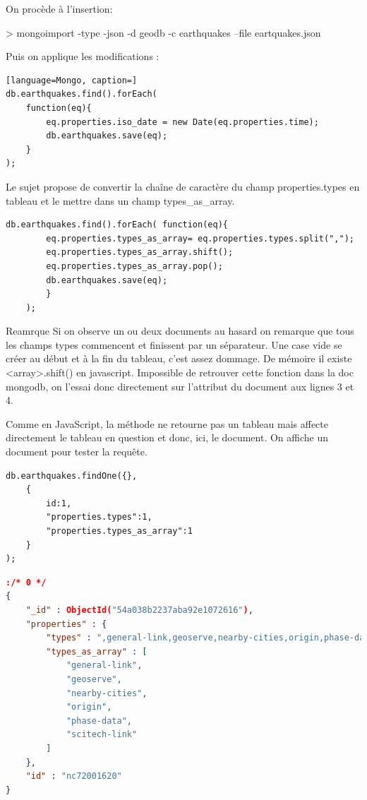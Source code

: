 On procède à l'insertion: \newline
    \begin{tt} > mongoimport -type -json -d geodb -c earthquakes --file
eartquakes.json \end{tt} \newline
    Puis on applique les modifications :
\begin{lstlisting}[language=Mongo, caption=]
db.earthquakes.find().forEach(
    function(eq){
        eq.properties.iso_date = new Date(eq.properties.time);
        db.earthquakes.save(eq);
    }
);
\end{lstlisting}

    Le sujet propose de convertir la chaîne de caractère du champ properties.types en tableau et le mettre dans un champ types\_as\_array.
    
    \begin{lstlisting}[language=Mongo, caption=Chaine de carractères vers tableau.]
    db.earthquakes.find().forEach( function(eq){
        eq.properties.types_as_array= eq.properties.types.split(",");
        eq.properties.types_as_array.shift();
        eq.properties.types_as_array.pop();
        db.earthquakes.save(eq);
        } 
    );
    \end{lstlisting}
    \begin{block}{Reamrque}
        Si on observe un ou deux documents au hasard on remarque que tous les champs types commencent et finissent par un séparateur. Une case vide se créer au début et à la fin du tableau, c’est assez dommage. De mémoire il existe <array>.shift() en javascript. Impossible de retrouver cette fonction dans la doc mongodb, on l’essai donc directement sur l’attribut du document aux lignes 3 et 4. 
    \end{block}

    \par
    Comme en JavaScript, la méthode ne retourne pas un tableau mais affecte directement le tableau en question et donc, ici, le document. On affiche un document pour  tester la requête.
    
    \begin{lstlisting}[language=Mongo, caption=Accès aux tableau Types\_as\_array d"un document.]
db.earthquakes.findOne({},
    {
        id:1,
        "properties.types":1,
        "properties.types_as_array":1
    }
);
    \end{lstlisting}
    
    \begin{lstlisting}[language=JSON, caption=Tableau de types et la chaine de carractère.]
    :/* 0 */
{
    "_id" : ObjectId("54a038b2237aba92e1072616"),
    "properties" : {
        "types" : ",general-link,geoserve,nearby-cities,origin,phase-data,scitech-link,",
        "types_as_array" : [ 
            "general-link", 
            "geoserve", 
            "nearby-cities", 
            "origin", 
            "phase-data", 
            "scitech-link"
        ]
    },
    "id" : "nc72001620"
}
    \end{lstlisting}
    
